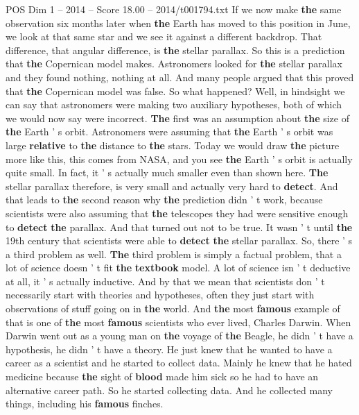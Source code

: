 \begin{textsample}{POS Dim 1 – 2014 – Score 18.00 – 2014/t001794.txt}
If we now make \textbf{the} same observation six months later when \textbf{the} Earth has moved to this position in June, we look at that same star and we see it against a different backdrop.
That difference, that angular difference, is \textbf{the} stellar parallax.
So this is a prediction that \textbf{the} Copernican model makes.
Astronomers looked for \textbf{the} stellar parallax and they found nothing, nothing at all.
And many people argued that this proved that \textbf{the} Copernican model was false.
So what happened?
Well, in hindsight we can say that astronomers were making two auxiliary hypotheses, both of which we would now say were incorrect. \textbf{The} first was an assumption about \textbf{the} size of \textbf{the} Earth ' s orbit.
Astronomers were assuming that \textbf{the} Earth ' s orbit was large \textbf{relative} to \textbf{the} distance to \textbf{the} stars.
Today we would draw \textbf{the} picture more like this, this comes from NASA, and you see \textbf{the} Earth ' s orbit is actually quite small.
In fact, it ' s actually much smaller even than shown here. \textbf{The} stellar parallax therefore, is very small and actually very hard to \textbf{detect}.
And that leads to \textbf{the} second reason why \textbf{the} prediction didn ' t work, because scientists were also assuming that \textbf{the} telescopes they had were sensitive enough to \textbf{detect} \textbf{the} parallax.
And that turned out not to be true.
It wasn ' t until \textbf{the} 19th century that scientists were able to \textbf{detect} \textbf{the} stellar parallax.
So, there ' s a third problem as well. \textbf{The} third problem is simply a factual problem, that a lot of science doesn ' t fit \textbf{the} \textbf{textbook} model.
A lot of science isn ' t deductive at all, it ' s actually inductive.
And by that we mean that scientists don ' t necessarily start with theories and hypotheses, often they just start with observations of stuff going on in \textbf{the} world.
And \textbf{the} most \textbf{famous} example of that is one of \textbf{the} most \textbf{famous} scientists who ever lived, Charles Darwin.
When Darwin went out as a young man on \textbf{the} voyage of \textbf{the} Beagle, he didn ' t have a hypothesis, he didn ' t have a theory.
He just knew that he wanted to have a career as a scientist and he started to collect data.
Mainly he knew that he hated medicine because \textbf{the} sight of \textbf{blood} made him sick so he had to have an alternative career path.
So he started collecting data.
And he collected many things, including his \textbf{famous} finches.

\end{textsample}
